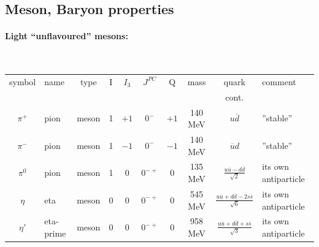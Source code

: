\subsection*{Meson, Baryon properties}

\newcommand{\fste}[1]{
{\raggedright
#1
}}
\newcommand{\ioa}{
\fste{its own antiparticle}
}

\newcommand{\tabletitle}[1]{
\paragraph{#1}\mbox{}\\
}
\tabletitle{Light ``unflavoured'' mesons:}
\begin{tabular}{|| c| l| *{7}{c|} p{2.3cm} ||}
\hline\hline
 symbol & name & type &  I & $I_3$ & $J^{PC}$ & Q & mass & quark & comment\\
        &      &      &    &&       &   &      & cont. &  
\\\hline\hline
 $\pi^{+}$     & pion & meson & 1 & $+1$ & $0^{-}$ & $+1$ & 140 MeV &
 $u\overline{d}$ 
&''stable''\footnotemark[1]
\\\hline
 $\pi^{-}$     & pion & meson & 1 & $-1$ & $0^{-}$ & $-1$ & 140 MeV &
 $\overline{u}d$
&''stable''\footnotemark[1]
\\\hline
 $\pi^0$    & pion & meson & 1 & $0$ & $0^{-+}$ & 0 & 135 MeV &
 $\frac{u\overline{u} - d\overline{d}}{\sqrt{2}}$ & \ioa
\\\hline
 $\eta$    & eta & meson & 0 & $0$ & $0^{-+}$ & 0 & 545 MeV &
 $\frac{u\overline{u} + d\overline{d} - 2s\overline{s}}{\sqrt{6}}$ & \ioa
\\\hline
 $\eta'$    & eta-prime & meson & 0 & $0$ & $0^{-+}$ & 0 & 958 MeV &
 $\frac{u\overline{u} + d\overline{d} + s\overline{s}}{\sqrt{3}}$ & \ioa
\\\hline
\end{tabular}

